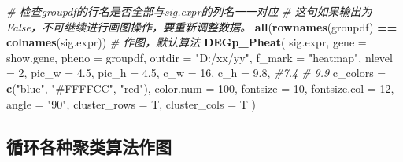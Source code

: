 \documentclass[
]{book}
\newenvironment{Shaded}{\begin{snugshade}}{\end{snugshade}}
\newcommand{\AttributeTok}[1]{\textcolor[rgb]{0.13,0.29,0.53}{#1}}
\newcommand{\CommentTok}[1]{\textcolor[rgb]{0.56,0.35,0.01}{\textit{#1}}}
\newcommand{\DecValTok}[1]{\textcolor[rgb]{0.00,0.00,0.81}{#1}}
\newcommand{\FloatTok}[1]{\textcolor[rgb]{0.00,0.00,0.81}{#1}}
\newcommand{\FunctionTok}[1]{\textcolor[rgb]{0.13,0.29,0.53}{\textbf{#1}}}
\newcommand{\NormalTok}[1]{#1}
\newcommand{\SpecialCharTok}[1]{\textcolor[rgb]{0.81,0.36,0.00}{\textbf{#1}}}
\newcommand{\StringTok}[1]{\textcolor[rgb]{0.31,0.60,0.02}{#1}}
\begin{document}
\begin{Shaded}
\begin{Highlighting}[]
\CommentTok{\# 检查groupdf的行名是否全部与sig.expr的列名一一对应}
\CommentTok{\# 这句如果输出为False，不可继续进行画图操作，要重新调整数据。}
\FunctionTok{all}\NormalTok{(}\FunctionTok{rownames}\NormalTok{(groupdf) }\SpecialCharTok{==} \FunctionTok{colnames}\NormalTok{(sig.expr))}
\CommentTok{\# 作图，默认算法}
\FunctionTok{DEGp\_Pheat}\NormalTok{(}
\NormalTok{  sig.expr,}
  \AttributeTok{gene =}\NormalTok{ show.gene, }
  \AttributeTok{pheno =}\NormalTok{ groupdf,}
  \AttributeTok{outdir =} \StringTok{"D:/xx/yy"}\NormalTok{,}
  \AttributeTok{f\_mark =} \StringTok{"heatmap"}\NormalTok{,}
  \AttributeTok{nlevel =} \DecValTok{2}\NormalTok{,}
  \AttributeTok{pic\_w =} \FloatTok{4.5}\NormalTok{,}
  \AttributeTok{pic\_h =} \FloatTok{4.5}\NormalTok{,}
  \AttributeTok{c\_w =} \DecValTok{16}\NormalTok{,}
  \AttributeTok{c\_h =} \FloatTok{9.8}\NormalTok{, }\CommentTok{\#7.4 \# 9.9}
  \AttributeTok{c\_colors =} \FunctionTok{c}\NormalTok{(}\StringTok{"blue"}\NormalTok{, }\StringTok{"\#FFFFCC"}\NormalTok{, }\StringTok{"red"}\NormalTok{),}
  \AttributeTok{color.num =} \DecValTok{100}\NormalTok{,}
  \AttributeTok{fontsize =} \DecValTok{10}\NormalTok{,}
  \AttributeTok{fontsize.col =} \DecValTok{12}\NormalTok{,}
  \AttributeTok{angle =} \StringTok{"90"}\NormalTok{,}
  \AttributeTok{cluster\_rows =}\NormalTok{ T,}
  \AttributeTok{cluster\_cols =}\NormalTok{ T}
\NormalTok{)}
\end{Highlighting}
\end{Shaded}

\subsection{循环各种聚类算法作图}\label{ux5faaux73afux5404ux79cdux805aux7c7bux7b97ux6cd5ux4f5cux56fe}
\end{document}
